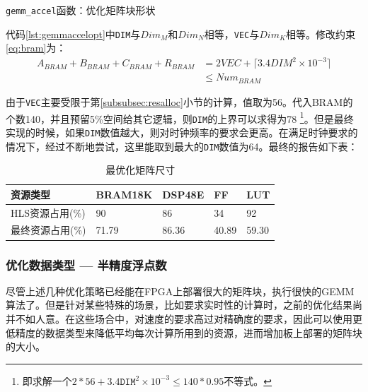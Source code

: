 \begin{listing}[!ht]

\caption{\texttt{gemm\_accel}函数：优化矩阵块形状}
\label{lst:gemmaccelopt}
\end{listing}

代码\ref{lst:gemmaccelopt}中\texttt{DIM}与\(\mathit{Dim_M}\)和\(\mathit{Dim_N}\)相等，\texttt{VEC}与\(\mathit{Dim_K}\)相等。修改约束\ref{eq:bram}为：
\begin{equation}
\begin{aligned}
\mathit{A_{BRAM} + B_{BRAM} + C_{BRAM} + R_{BRAM}}
& = \mathit{2VEC} + \lceil \mathit{3.4 DIM^2 \times 10^{-3}} \rceil \\
& \leq \mathit{Num_{BRAM}}
\end{aligned}
\end{equation}

由于\texttt{VEC}主要受限于第\ref{subsubsec:resalloc}小节的计算，值取为56。代入BRAM的个数140，并且预留5\%空间给其它逻辑，则\texttt{DIM}的上界可以求得为78
\footnote{即求解一个$2*56 + 3.4 \mathtt{DIM}^2 \times 10^{-3} \leq 140*0.95$不等式。}。但是最终实现的时候，如果\texttt{DIM}数值越大，则对时钟频率的要求会更高。在满足时钟要求的情况下，经过不断地尝试，这里能取到最大的\texttt{DIM}数值为64。最终的报告如下表：

\begin{table}[!ht]
	\centering
	\begin{tabular}{|l|l|l|l|l|}
		\hline
		资源类型 & BRAM18K  & DSP48E & FF & LUT \\ \hline
		HLS资源占用(\%) & 90 & 86 & 34 & 92 \\ \hline
		最终资源占用(\%) & 71.79 & 86.36 & 40.89 & 59.30 	\\ \hline
	\end{tabular}
	
	\caption{最优化矩阵尺寸}
	\label{table:gemmirropt}
\end{table}

\subsubsection{优化数据类型 — 半精度浮点数}\label{subsubsec:half}
尽管上述几种优化策略已经能在FPGA上部署很大的矩阵块，执行很快的GEMM算法了。但是针对某些特殊的场景，比如要求实时性的计算时，之前的优化结果尚并不如人意。在这些场合中，对速度的要求高过对精确度的要求，因此可以使用更低精度的数据类型来降低平均每次计算所用到的资源，进而增加板上部署的矩阵块的大小。

